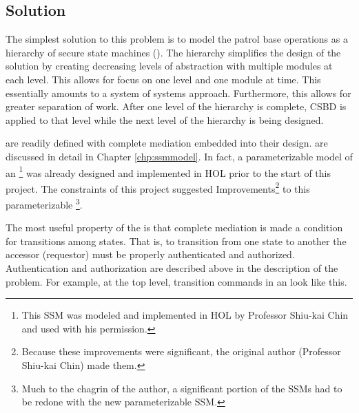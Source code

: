 \documentclass[../../main/main.tex]{subfiles}
\begin{document}

\subsection{Solution}
The simplest solution to this problem is to model the patrol base operations as a hierarchy of secure state machines ().  The hierarchy simplifies the design of the solution by creating decreasing levels of abstraction with multiple modules at each level.  This allows for focus on one level and one module at time. This essentially amounts to a system of systems approach.  Furthermore, this allows for greater separation of work.  After one level of the hierarchy is complete, CSBD is applied to that level while the next level of the hierarchy is being designed.

 are readily defined with complete mediation embedded into their design.   are discussed in detail in Chapter \ref{chp:ssmmodel}.  In fact, a parameterizable model of an \footnote{This SSM was modeled and implemented in HOL by Professor Shiu-kai Chin and used with his permission.} was already designed and implemented in HOL prior to the start of this project.  The constraints of this project suggested Improvements\footnote{Because these improvements were significant, the original author (Professor Shiu-kai Chin) made them.} to this parameterizable \footnote{Much to the chagrin of the author, a significant portion of the SSMs had to be redone with the new parameterizable SSM.}.

The most useful property of the  is that complete mediation is made a condition for transitions among states.  That is, to transition from one state to another the accessor (requestor) must be properly authenticated and authorized. Authentication and authorization are described above in the description of the problem.   For example, at the top level, transition commands in an  look like this.
\end{document}
